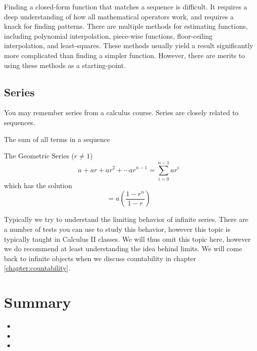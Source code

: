\documentclass[main.tex]{subfiles}
\begin{document}
Finding a closed-form function that matches a sequence is difficult. It requires a deep understanding of how all mathematical operators work, and requires a knack for finding patterns. There are multiple methods for estimating functions, including polynomial interpolation, piece-wise functions, floor-ceiling interpolation, and least-squares. These methods usually yield a result significantly more complicated than finding a simpler function. However, there are merits to using these methods as a starting-point.

\subsection{Series}

You may remember series from a calculus course. Series are closely related to sequences.

\begin{defn}
	The sum of all terms in a sequence
\end{defn}

\begin{example}
	The Geometric Series (\(r \neq 1\)) \[a + ar + ar^2 + \cdots ar^{n-1} = \sum_{i=0}^{n-1} ar^i\]
	which has the solution \[= a(\frac{1-r^n}{1-r})\]
\end{example}

Typically we try to understand the limiting behavior of infinite series. There are a number of tests you can use to study this behavior, however this topic is typically taught in Calculus II classes. We will thus omit this topic here, however we do recommend at least understanding the idea behind limits. We will come back to infinite objects when we discuss countability in chapter \ref{chapter:countability}.


\section{Summary}

\begin{itemize}
	\item 
	\item 
	\item 
\end{itemize}
\end{document}
